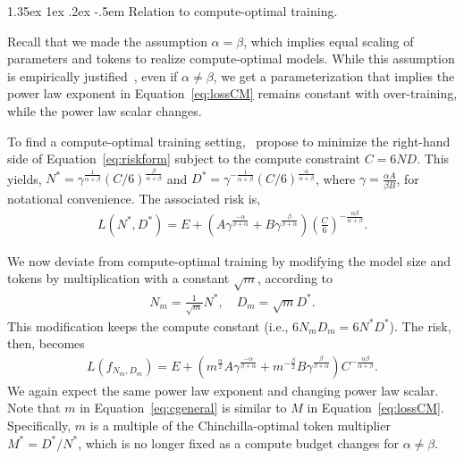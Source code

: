 \documentclass[dvipsnames,11pt]{article}
\makeatletter
\renewcommand\paragraph{\@startsection{paragraph}{4}{\z@}                                     {1.35ex \@plus1ex \@minus.2ex}                                {-.5em}
{\normalfont\normalsize\bfseries}}
\makeatother
\begin{document}
\begin{appendix}
\paragraph{Relation to compute-optimal training.}

Recall that we made the assumption $\alpha=\beta$, which implies equal scaling of parameters and tokens to realize compute-optimal models.
While this assumption is empirically justified~\cite{chinchilla}, even if $\alpha \neq \beta$, we get a parameterization that implies the power law exponent in Equation~\eqref{eq:lossCM} remains constant with over-training, while the power law scalar changes.

To find a compute-optimal training setting,~\citet{chinchilla} propose to minimize the right-hand side of Equation~\eqref{eq:riskform} subject to the compute constraint $C = 6ND$. This yields, 
$
N^\ast = \gamma^{\frac{1}{\alpha + \beta}} (C/6)^{\frac{\beta}{\alpha + \beta}}
$ and 
$
D^\ast = \gamma^{-\frac{1}{\alpha + \beta}} (C/6)^{\frac{\alpha}{\alpha + \beta}}$, where $\gamma = \frac{\alpha A}{ \beta B}$, for notational convenience. 
The associated risk is,
\begin{align*}
L(N^\ast,D^\ast)
= E + \left( A\gamma^{\frac{-\alpha}{\beta+\alpha}} + B \gamma^{\frac{\beta}{\beta+\alpha}} \right) \left(\frac{C}{6}\right)^{-\frac{\alpha \beta}{\alpha + \beta}}.
\end{align*}

We now deviate from compute-optimal training by modifying the model size and tokens by multiplication with a constant $\sqrt{m}$, according to 
\begin{align}
\label{eq:tokenmtp}
N_m = \frac{1}{\sqrt{m}} N^\ast, 
\quad
D_m = \sqrt{m} D^\ast.
\end{align}
This modification keeps the compute constant (i.e., $6N_m D_m = 6N^\ast D^\ast$). The risk, then, becomes 
\begin{align}
\label{eq:cgeneral}
L(f_{N_m,D_m})
= E 
+ \left(m^{\frac{\alpha}{2}} A\gamma^{\frac{-\alpha}{\beta+\alpha}} + m^{-\frac{\beta}{2}} B \gamma^{\frac{\beta}{\beta+\alpha}} \right) C^{-\frac{\alpha \beta}{\alpha + \beta}}.
\end{align}
We again expect the same power law exponent and changing power law scalar. 
Note that $m$ in Equation~\eqref{eq:cgeneral} is similar to $M$ in Equation~\eqref{eq:lossCM}. Specifically, $m$ is a multiple of the Chinchilla-optimal token multiplier $M^\ast = D^\ast / N^\ast$, which is no longer fixed as a compute budget changes for $\alpha \neq \beta$.
\clearpage


\end{appendix}
\end{document}
